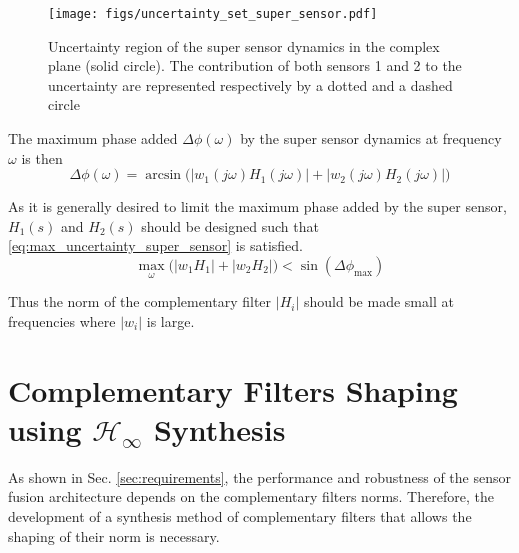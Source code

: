 \documentclass[letterpaper, 10 pt, conference]{ieeeconf}
\begin{document}
\begin{figure}[htbp]
\centering
\texttt{[image: figs/uncertainty\_set\_super\_sensor.pdf]}
\caption{\label{fig:uncertainty_set_super_sensor}
Uncertainty region of the super sensor dynamics in the complex plane (solid circle). The contribution of both sensors 1 and 2 to the uncertainty are represented respectively by a dotted and a dashed circle}
\end{figure}

The maximum phase added \(\Delta\phi(\omega)\) by the super sensor dynamics at frequency \(\omega\) is then
\begin{equation}
\label{eq:max_phase_uncertainty}
    \Delta\phi(\omega) = \arcsin\big( |w_1(j\omega) H_1(j\omega)| + |w_2(j\omega) H_2(j\omega)| \big)
\end{equation}

As it is generally desired to limit the maximum phase added by the super sensor, \(H_1(s)\) and \(H_2(s)\) should be designed such that \eqref{eq:max_uncertainty_super_sensor} is satisfied.
\begin{equation}
\label{eq:max_uncertainty_super_sensor}
   \max_\omega \big( \left|w_1 H_1\right| + \left|w_2 H_2\right|\big) < \sin\left( \Delta \phi_\text{max} \right)
\end{equation}

Thus the norm of the complementary filter \(|H_i|\) should be made small at frequencies where \(|w_i|\) is large.

\section{Complementary Filters Shaping using \(\mathcal{H}_\infty\) Synthesis}
\label{sec:org332cb3d}
\label{sec:hinf_method}
As shown in Sec. \ref{sec:requirements}, the performance and robustness of the sensor fusion architecture depends on the complementary filters norms.
Therefore, the development of a synthesis method of complementary filters that allows the shaping of their norm is necessary.
\end{document}
